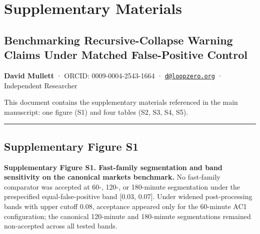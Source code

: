 \documentclass[
  11pt,
]{article}
\author{}
\date{}
\begin{document}
\section{Supplementary Materials}\label{supplementary-materials}

\subsection{Benchmarking Recursive-Collapse Warning Claims Under Matched
False-Positive
Control}\label{benchmarking-recursive-collapse-warning-claims-under-matched-false-positive-control}

\textbf{David Mullett} · ORCID: 0009-0004-2543-1664 ·
\href{mailto:d@loopzero.org}{\nolinkurl{d@loopzero.org}} · Independent
Researcher

This document contains the supplementary materials referenced in the
main manuscript: one figure (S1) and four tables (S2, S3, S4, S5).

\begin{center}\rule{0.5\linewidth}{0.5pt}\end{center}

\subsection{Supplementary Figure S1}\label{supplementary-figure-s1}

\textbf{Supplementary Figure S1. Fast-family segmentation and band
sensitivity on the canonical markets benchmark.} No fast-family
comparator was accepted at 60-, 120-, or 180-minute segmentation under
the prespecified equal-false-positive band {[}0.03, 0.07{]}. Under
widened post-processing bands with upper cutoff 0.08, acceptance
appeared only for the 60-minute AC1 configuration; the canonical
120-minute and 180-minute segmentations remained non-accepted across all
tested bands.
\end{document}

